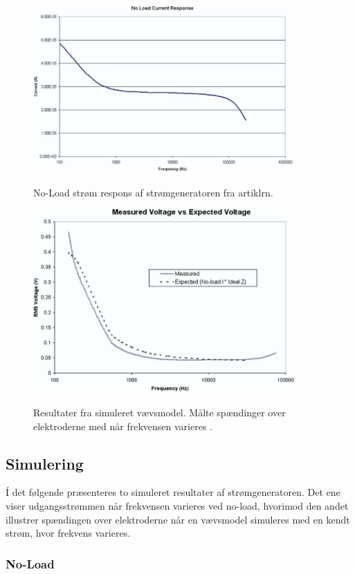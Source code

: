 \begin{figure}[H]
\centering
{\includegraphics[width=10cm]
{Figure/oprindeligenoload}}
\caption{No-Load strøm respons af strømgeneratoren fra  artiklrn\cite{Aroom2009}.}
\label{fig:oprindeligeonload}
\end{figure}




\begin{figure}[H]
\centering
{\includegraphics[width=10cm]
{Figure/oprindeligerms}}
\caption{Resultater fra simuleret vævsmodel. Målte spændinger over elektroderne med når frekvensen varieres \citep{Aroom2009}.}
\label{fig:oprindeligerms}
\end{figure}


\subsection{Simulering}
Í det følgende præsenteres to simuleret resultater af strømgeneratoren. Det ene viser udgangsstrømmen når frekvensen varieres ved no-load, hvorimod den andet illustrer spændingen over elektroderne når en vævsmodel simuleres med en kendt strøm, hvor frekvens varieres. 
 


\subsubsection{No-Load}

